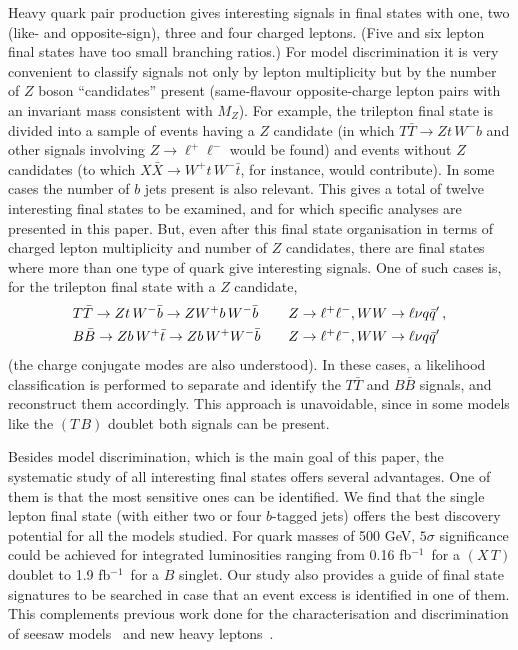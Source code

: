 \documentclass[12pt,a4paper]{article}
\newcommand{\fbin}{fb$^{-1}$}
\newcommand{\TT}{T \bar T}
\newcommand{\BB}{B \bar B}
\newcommand{\XX}{X \bar X}
\newcommand{\TB}{(T \, B)}
\newcommand{\XT}{(X \, T)}
\begin{document}
Heavy quark pair production gives interesting signals in final states with one, two (like- and opposite-sign), three and four charged leptons. (Five and six lepton final states have too small branching ratios.) For model discrimination it is very convenient to classify signals not only by lepton multiplicity but by the number of $Z$ boson ``candidates'' present (same-flavour opposite-charge lepton pairs with an invariant mass consistent with $M_Z$). For example, the trilepton final state is divided into a sample of events having a $Z$ candidate (in which $\TT \to Zt \, W^- b$ and other signals involving $Z \to \ell^+ \ell^-$ would be found) and events without $Z$ candidates (to which $\XX \to W^+ t \, W^- \bar t$, for instance, would contribute). In some cases the number of $b$ jets present is also relevant. This gives a total of twelve interesting final states to be examined, and for which specific analyses are presented in this paper. But, even after this final state organisation in terms of charged lepton multiplicity and number of $Z$ candidates, there are final states where more than one type of quark give interesting signals. One of such cases is, for the trilepton final state
with a $Z$ candidate,
\begin{align}
& \TT \to Zt \, W^- \bar b \to Z W^+ b \, W^- \bar b &&
\quad Z \to \ell^+ \ell^- , WW \to \ell \nu q \bar q' \,,
\notag \\
& \BB \to Zb \, W^+ \bar t \to Z b \, W^+ W^- \bar b &&
\quad Z \to \ell^+ \ell^- , WW \to \ell \nu q \bar q'
\end{align}
(the charge conjugate modes are also understood). In these cases, a likelihood classification is performed to separate and identify the $\TT$ and $\BB$ signals, and reconstruct them accordingly. This approach is unavoidable, since in some models like the $\TB$ doublet both signals can be present.

Besides model discrimination, which is the main goal of this paper, the systematic study of all interesting final states offers several advantages. One of them is that the most sensitive ones can be identified. We find that the single lepton final state (with either two or four $b$-tagged jets) offers the best discovery potential for all the models studied. For quark masses of 500 GeV, $5\sigma$ significance could be achieved for integrated luminosities ranging from 0.16 \fbin\ for a $\XT$ doublet to 1.9 \fbin\ for a $B$ singlet. Our study also provides a guide of final state signatures to be searched in case that an event excess is identified in one of them. This complements previous work done for the characterisation and discrimination of seesaw models~\cite{delAguila:2008cj,delAguila:2008hw} and new heavy leptons~\cite{AguilarSaavedra:2009ik}.
\end{document}
